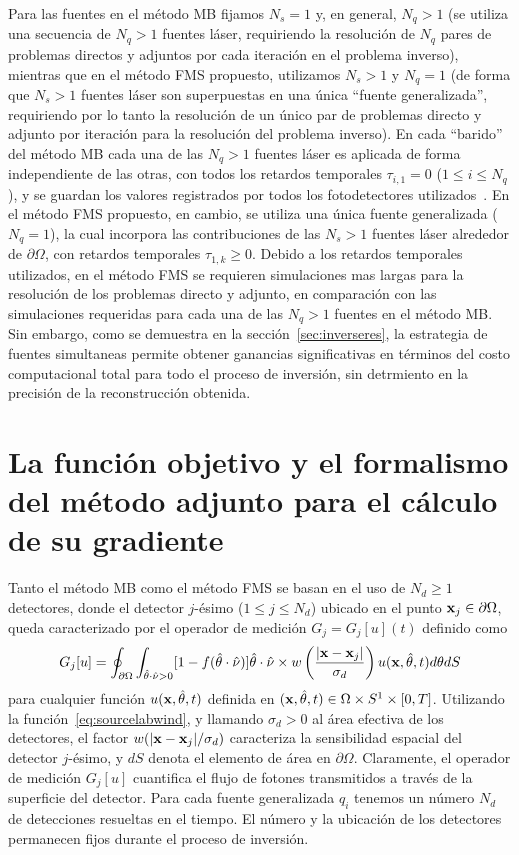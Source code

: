 Para las fuentes en el método MB fijamos $N_s=1$ y, en general, $N_q>1$ 
(se utiliza una secuencia de $N_q>1$ fuentes láser, requiriendo la resolución de 
$N_q$ pares de problemas directos y adjuntos por cada iteración en el problema inverso), 
mientras que en el método FMS propuesto, utilizamos $N_s>1$ y $N_q=1$ (de forma 
que $N_s>1$ fuentes láser son superpuestas en una única ``fuente generalizada'', 
requiriendo por lo tanto la resolución de un único par de problemas directo y 
adjunto por iteración para la resolución del problema inverso). En cada ``barido''
del método MB cada una de las $N_q>1$ fuentes láser es aplicada de forma 
independiente de las otras, con todos los retardos temporales $\tau_{i,1}=0$ ($1\leq i\leq N_q$), y se guardan los valores registrados por todos los fotodetectores utilizados~\cite{Prieto2017,Dorn}. En el método FMS propuesto, en cambio, 
se utiliza una única fuente generalizada ($N_q=1$), la cual incorpora 
las contribuciones de las $N_s>1$ fuentes láser alrededor de $\partial \Omega$, 
con retardos temporales $\tau_{1,k}\geq 0$. Debido a los retardos temporales 
utilizados, en el método FMS se requieren simulaciones mas largas para la resolución de los problemas directo y adjunto, en comparación con las simulaciones requeridas 
para cada una de las $N_q>1$ fuentes en el método MB. Sin embargo, como se 
demuestra en la sección~\ref{sec:inverseres}, la estrategia de fuentes simultaneas 
permite obtener ganancias significativas en términos del costo computacional 
total para todo el proceso de inversión, sin detrmiento en la precisión de la 
reconstrucción obtenida. 

\section{La función objetivo y el formalismo del método adjunto para el cálculo de su gradiente}

Tanto el método MB como el método FMS se basan en el uso de  $N_d\geq 1$ detectores, 
donde el detector $j$-ésimo ($1\leq j\leq N_d$) ubicado en el punto 
$\mathbf{x}_j \in \partial \Omega$, queda caracterizado por el operador 
de medición $G_j=G_j[u](t)$ definido como 
\begin{equation}
  G_j[u]=\oint_{\partial \Omega}\int_{\hat{\theta} \cdot \hat{\nu}>0}[1-f(\hat{\theta}
  \cdot \hat{\nu})]
  \hat{\theta} \cdot \hat{\nu} 
  \times w\left( \frac{ |\mathbf{x}-\mathbf{x}_j |}{\sigma_d} \right) u(\mathbf{x},\hat{\theta},t)
  d\theta dS
\label{eq:OpMed}
\end{equation}
para cualquier función $u(\mathbf{x},\hat{\theta},t)$ definida en $(\mathbf{x},\hat{\theta},t)\in\Omega\times S^1 \times [0,T] $. 
Utilizando la función~\eqref{eq:sourcelabwind}, y llamando $\sigma_d>0$ 
al área efectiva de los detectores, el factor $w( |\mathbf{x}-\mathbf{x}_j |/\sigma_d) $ 
caracteriza la sensibilidad espacial del detector $j$-ésimo, 
y $dS$ denota el elemento de área en $\partial \Omega$. 
Claramente, el operador de medición $G_j[u]$ cuantifica el flujo de fotones 
transmitidos a través de la superficie del detector. Para cada 
fuente generalizada $q_i$ tenemos un número $N_d$ de detecciones 
resueltas en el tiempo. El número y la ubicación de los detectores 
permanecen fijos durante el proceso de inversión. 

